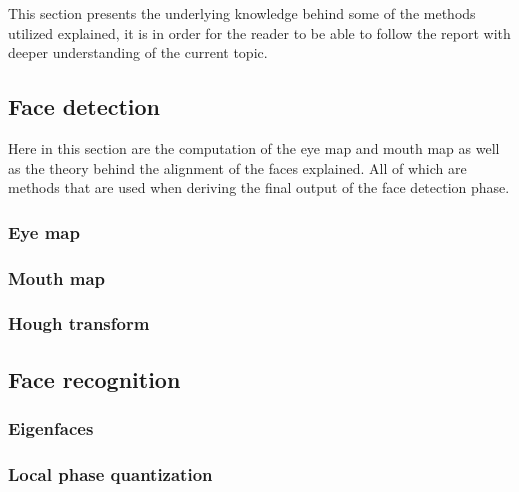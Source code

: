 This section presents the underlying knowledge behind some of the methods utilized explained, it is in order for the reader to be able to follow the report with deeper understanding of the current topic.

\subsection{Face detection}

Here in this section are the computation of the eye map and mouth map as well as the theory behind the alignment of the faces explained. All of which are methods that are used when deriving the final output of the face detection phase.

\subsubsection{Eye map}
\label{sub:FaceDetection}


\subsubsection{Mouth map}


\subsubsection{Hough transform}


\subsection{Face recognition}
\label{sub:FaceRecognition}


\subsubsection{Eigenfaces}
\label{subs:Eigenfaces}


\subsubsection{Local phase quantization}
\label{subs:LocalPhaseQuantization}

